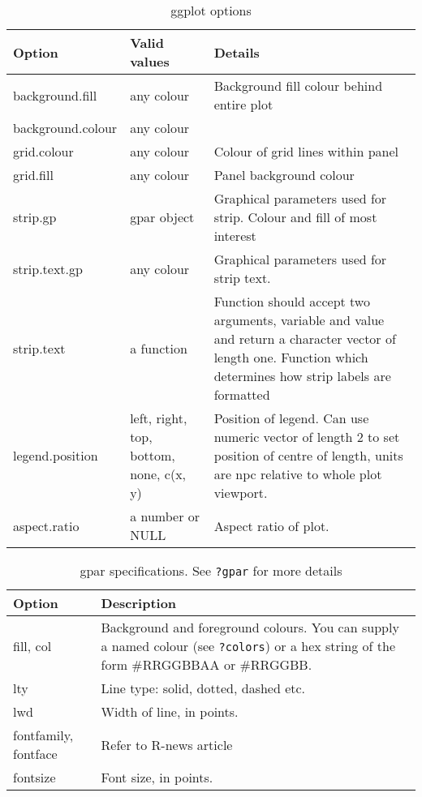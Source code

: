 \begin{table}
\begin{tabular}{lll}
Option & Valid values & Details \\
\hline
background.fill    & any colour & Background fill colour behind entire plot\\
background.colour  & any colour & \\
grid.colour        & any colour & Colour of grid lines within panel \\
grid.fill          & any colour & Panel background colour \\
strip.gp           & gpar object & Graphical parameters used for strip. Colour and fill of most interest \\
strip.text.gp      & any colour & Graphical parameters used for strip text. \\
strip.text         & a function & Function should accept two arguments, variable and value and return a character vector of length one. Function which determines how strip labels are formatted \\
legend.position    & left, right, top, bottom, none, c(x, y) & Position of legend.  Can use numeric vector of length 2 to set position of centre of length, units are npc relative to whole plot viewport. \\
aspect.ratio       & a number or NULL & Aspect ratio of plot. \\
\hline
\end{tabular}
  \caption{ggplot options}
  \label{tbl:options}
\end{table}

\begin{table}
  \begin{center}
  \begin{tabular}{ll}
  Option & Description \\
  \hline
  fill, col & Background and foreground colours.  You can supply a named colour (see {\tt ?colors}) or a hex string of the form #RRGGBBAA or #RRGGBB. \\
  lty & Line type: solid, dotted, dashed etc. \\
  lwd & Width of line, in points. \\
  fontfamily, fontface & Refer to R-news article \\
  fontsize & Font size, in points.  
    
  \end{tabular}
  \end{center}
  \caption{gpar specifications.  See {\tt ?gpar} for more details}
  \label{tbl:gpar}
\end{table}

